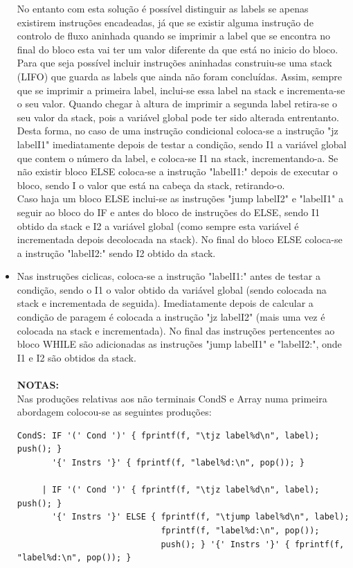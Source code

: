 \documentclass{report}
\begin{document}
\begin{itemize}
No entanto com esta solução é possível distinguir as labels se apenas existirem instruções encadeadas, já que se existir alguma instrução de controlo de fluxo aninhada quando se imprimir a label que se encontra no final do bloco esta vai ter um valor diferente da que está no inicio do bloco.\\
Para que seja possível incluir instruções aninhadas construiu-se uma stack (LIFO) que guarda as labels que ainda não foram concluídas. Assim, sempre que se imprimir a primeira label, inclui-se essa label na stack e incrementa-se o seu valor. Quando chegar à altura de imprimir a segunda label retira-se o seu valor da stack, pois a variável global pode ter sido alterada entrentanto.\\
Desta forma, no caso de uma instrução condicional coloca-se a instrução "jz labelI1" imediatamente depois de testar a condição, sendo I1 a variável global que contem o número da label, e coloca-se I1 na stack, incrementando-a. 
Se não existir bloco ELSE coloca-se a instrução "labelI1:" depois de executar o bloco, sendo I o valor que está na cabeça da stack, retirando-o.\\
Caso haja um bloco ELSE inclui-se as instruções "jump labelI2" e "labelI1" a seguir ao bloco do IF e antes do bloco de instruções do ELSE, sendo I1 obtido da stack e I2 a variável global (como sempre esta variável é incrementada depois decolocada na stack). No final do bloco ELSE coloca-se a instrução "labelI2:" sendo I2 obtido da stack.
\item Nas instruções ciclicas, coloca-se a instrução "labelI1:" antes de testar a condição, sendo o I1 o valor obtido da variável global (sendo colocada na stack e incrementada de seguida). Imediatamente depois de calcular a condição de paragem é colocada a instrução "jz labelI2" (mais uma vez é colocada na stack e incrementada). No final das instruções pertencentes ao bloco WHILE são adicionadas as instruções "jump labelI1" e "labelI2:", onde I1 e I2 são obtidos da stack.\\\\ 
\textbf{NOTAS:}\\
Nas produções relativas aos não terminais CondS e Array numa primeira abordagem colocou-se as seguintes produções:
\begin{verbatim}
CondS: IF '(' Cond ')' { fprintf(f, "\tjz label%d\n", label); push(); }
	   '{' Instrs '}' { fprintf(f, "label%d:\n", pop()); }

     | IF '(' Cond ')' { fprintf(f, "\tjz label%d\n", label); push(); }
       '{' Instrs '}' ELSE { fprintf(f, "\tjump label%d\n", label);
     			  		     fprintf(f, "label%d:\n", pop()); 
   						     push(); } '{' Instrs '}' { fprintf(f, "label%d:\n", pop()); }


\end{verbatim}
\end{itemize}
\end{document}

